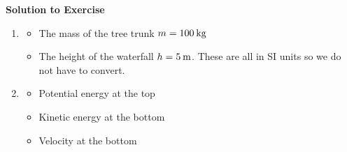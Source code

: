 {\begin{mdframed}[linewidth=4, leftmargin=40, rightmargin=40]
\begin{exercise}
\begin{figure}[H]
\begin{center}
      \vspace{2pt}
    \vspace{.1in}
    
    \end{center}

 \end{figure}   

    \addtocounter{footnote}{-0}
    
        \par 
        
        \vspace{5pt}
        \label{m38786*solfhsst!!!underscore!!!id1919}\noindent\textbf{Solution to Exercise } \label{m38786*listfhsst!!!underscore!!!id1919}\begin{enumerate}[noitemsep, label=\textbf{Step} \textbf{\arabic*}. ] 
            \leftskip=20pt\rightskip=\leftskip\item  
        \label{m38786*id69257}\begin{itemize}[noitemsep]
            \leftskip=20pt\rightskip=\leftskip\label{m38786*uid83}\item The mass of the tree trunk \begin{math}m=100\phantom{\rule{2pt}{0ex}}\mathrm{kg}\end{math}
\label{m38786*uid84}\item The height of the waterfall \begin{math}h=5\phantom{\rule{2pt}{0ex}}\mathrm{m}\end{math}.
These are all in SI units so we do not have to convert.
\end{itemize}
        
        \item  
        \label{m38786*id69314}\begin{itemize}[noitemsep]
            \leftskip=20pt\rightskip=\leftskip\label{m38786*uid85}\item Potential energy at the top
\label{m38786*uid86}\item Kinetic energy at the bottom
\label{m38786*uid87}\item Velocity at the bottom
\end{itemize}
        

\end{enumerate}
\end{exercise}
\end{mdframed}}
